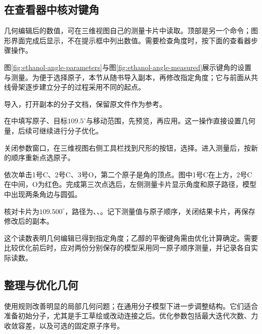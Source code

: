 \subsection{在查看器中核对键角}

几何编辑后的数值，可在三维视图自己的测量卡片中读取。顶部是另一个命令；图形界面完成后显示，不在提示框中列出数值。需要检查角度时，按下面的查看器步骤操作。

图\ref{fig:ethanol-angle-parameters}与图\ref{fig:ethanol-angle-measured}展示键角的设置与测量。为便于选择原子，本节从随书\mbox{}导入副本，再修改指定角度；它与前面从共线骨架逐步建立分子的过程采用不同的起点。

\begin{steps}
  \item 导入\mbox{}，打开副本的分子文档，保留原文件作为参考。
  \item 在中填写原子、目标$109.5^\circ$与移动范围，先预览，再应用。这一操作直接设置几何量，后续可继续进行分子优化。
\end{steps}



\begin{steps}[resume]
  \item 关闭参数窗口，在三维视图右侧工具栏找到尺形的按钮，选择。进入测量后，按新的顺序重新点选原子。
  \item 依次单击1号C、2号C、3号O，第二个原子是角的顶点。图中1号C在上方，2号C在中间，O为红色。完成第三次点选后，左侧测量卡片显示角度和原子路径，模型中出现两条角边与圆弧。
  \item 核对卡片为$109.500^\circ$，路径为、、。记下测量值与原子顺序，关闭结果卡片，再保存修改后的副本。
\end{steps}

这个读数表明几何编辑已得到指定角度；乙醇的平衡键角需由优化计算确定。需要比较优化前后时，应对两份分别保存的模型采用同一原子顺序测量，并记录各自实际读数。



\subsection{整理与优化几何}

使用规则改善明显的局部几何问题；在通用分子模型下进一步调整结构。它们适合准备初始分子，尤其是手工草绘或改动连接之后。优化参数包括最大迭代次数、力收敛容差，以及可选的固定原子序号。

